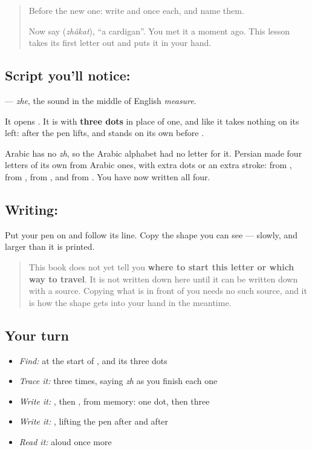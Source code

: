 \begin{quote}
Before the new one: write  and  once each, and name them.

Now say \textbf{} (\emph{zhâkat}), \textquotedblleft{}a cardigan\textquotedblright{}. You met it a moment ago. This lesson takes its first letter out and puts it in your hand.
\end{quote}

\subsection*{Script you'll notice: }
\textbf{} — \emph{zhe}, the sound in the middle of English \emph{measure}.

It opens \textbf{}. It is \textbf{} with \textbf{three dots} in place of one, and like \textbf{} it takes nothing on its left: after \textbf{} the pen lifts, and \textbf{} stands on its own before \textbf{}.

Arabic has no \emph{zh}, so the Arabic alphabet had no letter for it. Persian made four letters of its own from Arabic ones, with extra dots or an extra stroke: \textbf{} from \textbf{}, \textbf{} from \textbf{}, \textbf{} from \textbf{}, and \textbf{} from \textbf{}. You have now written all four.

\subsection*{Writing: }
Put your pen on  and follow its line. Copy the shape you can see — slowly, and larger than it is printed.

\begin{quote}
This book does not yet tell you \textbf{where to start this letter or which way to travel}. It is not written down here until it can be written down with a source. Copying what is in front of you needs no such source, and it is how the shape gets into your hand in the meantime.
\end{quote}

\subsection*{Your turn}
\begin{itemize}
\raggedright
  \item \emph{Find:}  at the start of \textbf{}, and its three dots
  \item \emph{Trace it:}  three times, saying \emph{zh} as you finish each one
  \item \emph{Write it:} , then , from memory: one dot, then three
  \item \emph{Write it:} \textbf{}, lifting the pen after  and after 
  \item \emph{Read it:} \textbf{} aloud once more
\end{itemize}

